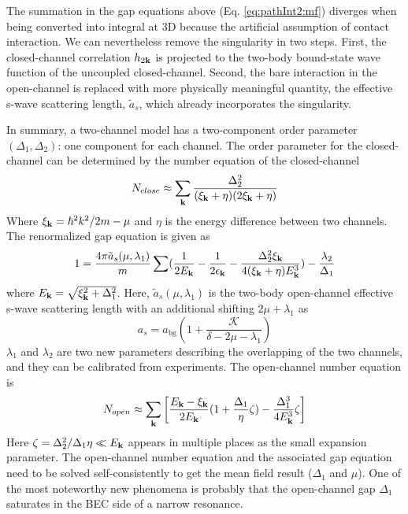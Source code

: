\documentclass[reprint,pra]{revtex4-1}
\begin{document}
 The summation in the gap equations above (Eq. \ref{eq:pathInt2:mf}) diverges when being converted into integral at 3D because the artificial assumption of contact interaction.  We can nevertheless remove the singularity in two steps.  First, the closed-channel correlation $h_{2\mathbf{k}}$ is projected to the two-body  bound-state wave function of the uncoupled closed-channel.  Second, the bare interaction in the open-channel is replaced with more physically meaningful quantity, the effective s-wave scattering length, $\tilde{a}_s$, which already incorporates the singularity. 
 
    In  summary, a two-channel model has a two-component order parameter $(\Delta_{1},\Delta_{2})$: one component for each channel.  The order parameter for the closed-channel can be determined by the number equation of the closed-channel
\begin{equation}
N_{close}\approx\sum_{\mathbf{k}}\frac{\Delta_{2}^2}{(\xi_{\mathbf{k}}+\eta)(2\xi_{\mathbf{k}}+\eta)}
\end{equation}
 Where $\xi_{\mathbf{k}}=\hbar^{2}k^{2}/2m-\mu$ and $\eta$ is the energy difference between two channels. The renormalized gap equation is given as
 \begin{equation}
1=\frac{4\pi{\tilde{a}_{s}(\mu,\lambda_{1})}}{m}\sum(\frac{1}{2E_{\mathbf{k}}}-\frac{1}{2\epsilon_{\mathbf{k}}}-\frac{\Delta_{2}^{2}\xi_{\mathbf{k}}}{4(\xi_{\mathbf{k}}+\eta){E_{\mathbf{k}}^{3}}})
	-\frac{\lambda_{2}}{\Delta_{1}}
\end{equation}
where $E_{\mathbf{k}}=\sqrt{\xi_{\mathbf{k}}^{2}+\Delta_{1}^{2}}$. Here, $\tilde{a}_{s}(\mu,\lambda_{1})$ is the two-body open-channel effective  s-wave scattering length with  an additional shifting $2\mu+\lambda_{1}$ as
\begin{equation}
{a}_{s}=a_{\text{bg}}(1+\frac{\mathcal{K}}{\delta-2\mu-\lambda_{1}})
\end{equation}
  $\lambda_{1}$ and $\lambda_{2}$ are two new parameters describing the overlapping of the two channels, and they can be calibrated from  experiments.  The open-channel number equation is
\begin{equation}
\begin{split}
N_{open}\approx\sum_{\mathbf{k}}\left[\frac{E_{\mathbf{k}}-\xi_{\mathbf{k}}}{2E_{\mathbf{k}}}(1+\frac{\Delta_{1}}{\eta}\zeta)-\frac{\Delta_{1}^{3}}{4E_{\mathbf{k}}^{3}}\zeta
	\right]	
\end{split}
\end{equation}
Here $\zeta=\Delta_{2}^{2}/\Delta_{1}\eta\ll{}E_{\mathbf{k}}$ appears in multiple places as the small expansion parameter.  The open-channel number equation and the associated gap equation need to be solved self-consistently to get  the mean field result ($\Delta_{1}$ and $\mu$).  One of the most noteworthy new phenomena is probably that the open-channel gap $\Delta_{1}$ saturates in the BEC side of  a narrow resonance. 
\end{document}
